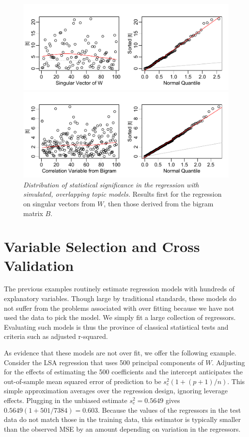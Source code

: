 \documentclass[10pt]{article}
\begin{document}
 
 \begin{figure}
 \caption{ \label{fig:simregr}
  {\sl Distribution of statistical significance in the regression with simulated, overlapping topic models.} Results first for the regression on singular vectors from $W$, then those derived from the bigram matrix $B$.}
   \centerline{ \includegraphics[width=5in]{figures/simregrW}  }
   \centerline{ \includegraphics[width=5in]{figures/simregrB}  }
 \end{figure}

\section{Variable Selection and Cross Validation}
\label{sec:cv}

The previous examples routinely estimate regression models with hundreds of explanatory variables.  Though large by traditional standards, these models do not suffer from the problems associated with over fitting because we have not used the data to pick the model.  We simply fit a large collection of regressors.  Evaluating such models is thus the province of classical statistical tests and criteria such as adjusted r-squared.  

As evidence that these models are not over fit, we offer the following example.  Consider the LSA regression that uses 500 principal components of $W$.  Adjusting for the effects of estimating the 500 coefficients and the intercept anticipates the out-of-sample mean squared error of prediction to be $s_e^2 (1+(p+1)/n)$.  This simple approximation averages over the regression design, ignoring leverage effects.  Plugging in the unbiased estimate $s_e^2 = 0.5649$ gives $0.5649 (1+501/7384) = 0.603$.  Because the values of the regressors in the test data do not match those in the training data, this estimator is typically smaller than the observed MSE by an amount depending on variation in the regressors.  
\end{document}
